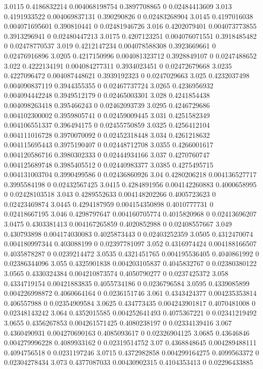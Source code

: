 {3.0115 0.4186832214 0.004068198754 0.3897708865 0 0.02484413609
3.013 0.4191933522 0.004069837131 0.390290826 0 0.02483268904
3.0145 0.4197016038 0.004071695601 0.390810441 0 0.02481946726
3.016 0.4202079401 0.004073773855 0.3913296941 0 0.02480447213
3.0175 0.4207123251 0.004076071551 0.3918485482 0 0.02478770537
3.019 0.4212147234 0.004078588308 0.3923669661 0 0.02476916896
3.0205 0.4217150996 0.004081323712 0.3928849107 0 0.0247488652
3.022 0.4222134191 0.004084277311 0.3934023451 0 0.02472679668
3.0235 0.4227096472 0.004087448621 0.3939192323 0 0.0247029663
3.025 0.4232037498 0.004090837119 0.3944355355 0 0.02467737724
3.0265 0.4236956932 0.004094442248 0.3949512179 0 0.02465003301
3.028 0.4241854438 0.004098263418 0.395466243 0 0.02462093739
3.0295 0.4246729686 0.004102300002 0.3959805741 0 0.02459009445
3.031 0.4251582349 0.004106551337 0.396494175 0 0.02455750859
3.0325 0.4256412104 0.004111016728 0.3970070092 0 0.02452318448
3.034 0.4261218632 0.004115695443 0.3975190407 0 0.02448712708
3.0355 0.4266001617 0.004120586716 0.3980302333 0 0.02444934166
3.037 0.4270760747 0.004125689748 0.3985405512 0 0.02440983377
3.0385 0.4275495715 0.004131003704 0.3990499586 0 0.02436860926
3.04 0.4280206218 0.004136527717 0.3995584198 0 0.02432567425
3.0415 0.4284891956 0.004142260883 0.4000658995 0 0.02428103518
3.043 0.4289552633 0.004148202266 0.4005723623 0 0.02423469874
3.0445 0.4294187959 0.004154350898 0.4010777731 0 0.02418667195
3.046 0.4298797647 0.004160705774 0.4015820968 0 0.02413696207
3.0475 0.4303381413 0.004167265859 0.4020852988 0 0.02408557667
3.049 0.430793898 0.004174030083 0.4025873443 0 0.02403252359
3.0505 0.4312470074 0.004180997344 0.403088199 0 0.02397781097
3.052 0.4316974424 0.004188166507 0.4035878287 0 0.0239214472
3.0535 0.4321451765 0.004195536405 0.4040861992 0 0.02386344096
3.055 0.4325901838 0.004203105837 0.4045832767 0 0.02380380122
3.0565 0.4330324384 0.004210873574 0.4050790277 0 0.0237425372
3.058 0.4334719154 0.00421883835 0.4055734186 0 0.0236796584
3.0595 0.4339085899 0.004226998872 0.4060664164 0 0.0236151746
3.061 0.4343424377 0.004235353814 0.406557988 0 0.02354909584
3.0625 0.434773435 0.004243901817 0.4070481008 0 0.02348143242
3.064 0.4352015585 0.004252641493 0.4075367221 0 0.02341219492
3.0655 0.4356267853 0.004261571425 0.4080238197 0 0.02334139416
3.067 0.4360490931 0.004270690163 0.4085093617 0 0.02326904125
3.0685 0.43646846 0.004279996228 0.4089933162 0 0.02319514752
3.07 0.4368848645 0.004289488111 0.4094756518 0 0.0231197246
3.0715 0.4372982858 0.004299164275 0.4099563372 0 0.02304278434
3.073 0.4377087033 0.00430902315 0.4104353413 0 0.02296433885
}
